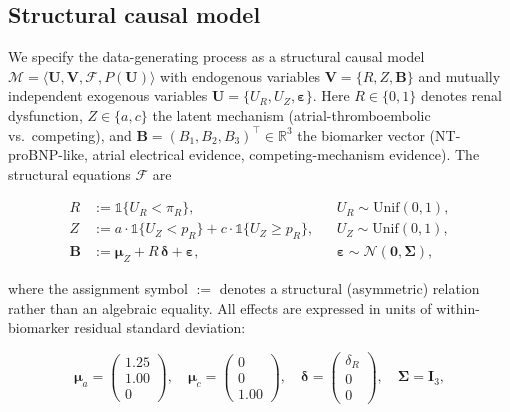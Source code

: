 
\subsection{Structural causal model}

We specify the data-generating process as a structural causal model
$\mathcal{M} = \langle \mathbf{U}, \mathbf{V}, \mathcal{F}, P(\mathbf{U}) \rangle$
with endogenous variables $\mathbf{V} = \{R, Z, \mathbf{B}\}$ and mutually
independent exogenous variables $\mathbf{U} = \{U_R, U_Z, \bm{\varepsilon}\}$.
Here $R \in \{0,1\}$ denotes renal dysfunction, $Z \in \{a, c\}$ the latent
mechanism (atrial-thromboembolic vs.\ competing), and
$\mathbf{B} = (B_1, B_2, B_3)^\top \in \mathbb{R}^3$ the biomarker vector
(NT-proBNP-like, atrial electrical evidence, competing-mechanism evidence).
The structural equations $\mathcal{F}$ are

\begin{align}
  R &:= \mathbb{1}\{U_R < \pi_R\},
    && U_R \sim \mathrm{Unif}(0,1), \label{eq:scm-r}\\
  Z &:= a \cdot \mathbb{1}\{U_Z < p_R\} + c \cdot \mathbb{1}\{U_Z \geq p_R\},
    && U_Z \sim \mathrm{Unif}(0,1), \label{eq:scm-z}\\
  \mathbf{B} &:= \bm{\mu}_Z + R\,\bm{\delta} + \bm{\varepsilon},
    && \bm{\varepsilon} \sim \mathcal{N}(\mathbf{0}, \bm{\Sigma}),
    \label{eq:scm-b}
\end{align}

where the assignment symbol $:=$ denotes a structural (asymmetric)
relation rather than an algebraic equality. All effects are expressed in
units of within-biomarker residual standard deviation:

\begin{equation}
  \bm{\mu}_a = \begin{pmatrix} 1.25 \\ 1.00 \\ 0 \end{pmatrix}, \quad
  \bm{\mu}_c = \begin{pmatrix} 0 \\ 0 \\ 1.00 \end{pmatrix}, \quad
  \bm{\delta} = \begin{pmatrix} \delta_R \\ 0 \\ 0 \end{pmatrix}, \quad
  \bm{\Sigma} = \mathbf{I}_3 ,
  \label{eq:params}
\end{equation}

